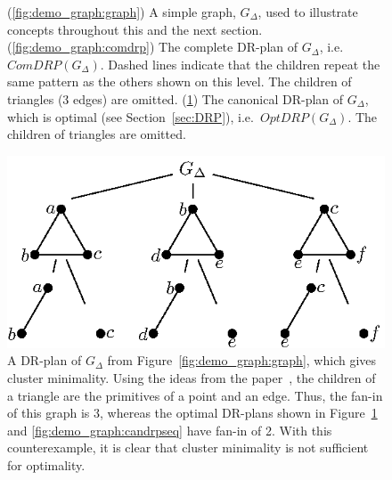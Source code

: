 \begin{figure}
\begin{subfigure}{0.3\linewidth}
    \caption{}\label{fig:demo_graph:candrp}
  \end{subfigure}%
  \caption{(\ref{fig:demo_graph:graph}) A simple graph, $G_{\Delta}$, used to illustrate concepts throughout this and the next section. (\ref{fig:demo_graph:comdrp}) The complete DR-plan of $G_{\Delta}$, i.e.\ $ComDRP(G_{\Delta})$. Dashed lines indicate that the children repeat the same pattern as the others shown on this level. The children of triangles (3 edges) are omitted. (\ref{fig:demo_graph:candrp}) The canonical DR-plan of $G_{\Delta}$, which is optimal (see Section~\ref{sec:DRP}), i.e.\ $OptDRP(G_{\Delta})$. The children of triangles are omitted.}
  \label{fig:demo_graph}
\end{figure}%

\begin{figure}\centering%
  \includegraphics[width=0.4\linewidth]{img/epsfromtikz/demo_graph_clustmindrp}
  \caption{A DR-plan of $G_{\Delta}$ from Figure~\ref{fig:demo_graph:graph}, which gives cluster minimality. Using the ideas from the paper~\cite{lomonosov2004graph}, the children of a triangle are the primitives of a point and an edge. Thus, the fan-in of this graph is 3, whereas the optimal DR-plans shown in Figure~\ref{fig:demo_graph:candrp} and \ref{fig:demo_graph:candrpseq} have fan-in of 2. With this counterexample, it is clear that cluster minimality is not sufficient for optimality.}
  \label{fig:demo_graph:clustmindrp}
\end{figure}%


